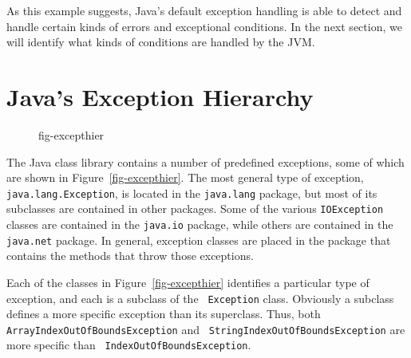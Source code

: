 As this example suggests, Java's default exception handling is able to
detect and handle certain kinds of errors and exceptional conditions. In
the next section, we will identify what kinds of conditions are handled
by the JVM.

\section{Java's Exception Hierarchy}
\label{sec-excepthier}\label{pg-sec-excepthier}

\begin{figure}[tb]
 {fig-excepthier}

\end{figure}

\noindent The Java class library contains a number of predefined exceptions,
some of which are shown in Figure~\ref{fig-excepthier}.  The most
general type of exception, {\tt java.lang.Exception}, is located in
the {\tt java.lang} package, but most of its subclasses
are contained in other packages.  Some of the various {\tt IOException}
classes are contained in the {\tt java.io} package, while others are
contained in the {\tt java.net}
package.  In general, exception classes are placed in the package that
contains the methods that throw those exceptions.

Each of the classes in Figure~\ref{fig-excepthier} identifies a
particular type of exception, and each is a subclass of the {\tt
Exception} class.  Obviously a subclass defines a more specific
exception than its superclass.  Thus, both {\tt
Array\-IndexOutOfBoundsException} and {\tt
StringIndexOutOfBounds\-Excep\-tion} are more specific than {\tt
Index\-OutOfBoundsException}.  


